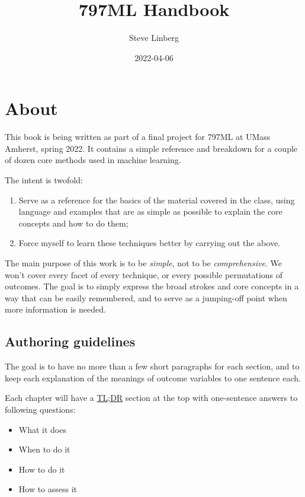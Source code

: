 \documentclass[
]{book}
\title{797ML Handbook}
\author{Steve Linberg}
\date{2022-04-06}
\providecommand{\tightlist}{%
  \setlength{\itemsep}{0pt}\setlength{\parskip}{0pt}}
\begin{document}
\maketitle

{
\setcounter{tocdepth}{1}
\tableofcontents
}
\hypertarget{about}{%
\chapter{About}\label{about}}

This book is being written as part of a final project for 797ML at UMass
Amherst, spring 2022. It contains a simple reference and breakdown for a
couple of dozen core methods used in machine learning.

The intent is twofold:

\begin{enumerate}
\def\labelenumi{\arabic{enumi}.}
\tightlist
\item
  Serve as a reference for the basics of the material covered in the class, using language and examples that are as simple as possible to explain the core concepts and how to do them;
\item
  Force myself to learn these techniques better by carrying out the above.
\end{enumerate}

The main purpose of this work is to be \emph{simple}, not to be \emph{comprehensive}. We won't cover every facet of every technique, or every possible permutations of outcomes. The goal is to simply express the broad strokes and core concepts in a way that can be easily remembered, and to serve as a jumping-off point when more information is needed.

\hypertarget{authoring-guidelines}{%
\section{Authoring guidelines}\label{authoring-guidelines}}

The goal is to have no more than a few short paragraphs for each section, and to keep each explanation of the meanings of outcome variables to one sentence each.

Each chapter will have a \href{https://en.wikipedia.org/wiki/Wikipedia:Too_long;_didn\%27t_read}{TL;DR} section at the top with one-sentence answers to following questions:

\begin{itemize}
\tightlist
\item
  What it does
\item
  When to do it
\item
  How to do it
\item
  How to assess it
\end{itemize}
\end{document}
